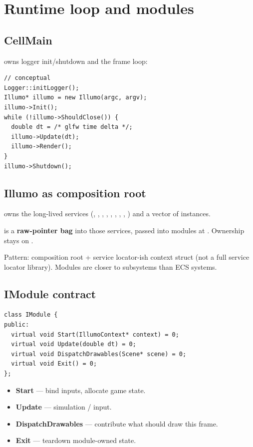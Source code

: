 \section{Runtime loop and modules}
\label{sec:runtime}

\subsection{CellMain}
 owns logger init/shutdown and the frame loop:
\begin{lstlisting}
// conceptual
Logger::initLogger();
Illumo* illumo = new Illumo(argc, argv);
illumo->Init();
while (!illumo->ShouldClose()) {
  double dt = /* glfw time delta */;
  illumo->Update(dt);
  illumo->Render();
}
illumo->Shutdown();
\end{lstlisting}

\subsection{Illumo as composition root}
 owns the long-lived services (,
, , ,
, , ,
, ) and a vector of
 instances.

 is a \textbf{raw-pointer bag} into those services,
passed into modules at . Ownership stays on .

\begin{inferencebox}
Pattern: composition root + service locator-ish context struct (not a full
service locator library). Modules are closer to subsystems than ECS systems.
\end{inferencebox}

\subsection{IModule contract}
\begin{lstlisting}
class IModule {
public:
  virtual void Start(IllumoContext* context) = 0;
  virtual void Update(double dt) = 0;
  virtual void DispatchDrawables(Scene* scene) = 0;
  virtual void Exit() = 0;
};
\end{lstlisting}

\begin{itemize}
  \item \textbf{Start} --- bind inputs, allocate game state.
  \item \textbf{Update} --- simulation / input.
  \item \textbf{DispatchDrawables} --- contribute what should draw this frame.
  \item \textbf{Exit} --- teardown module-owned state.
\end{itemize}

